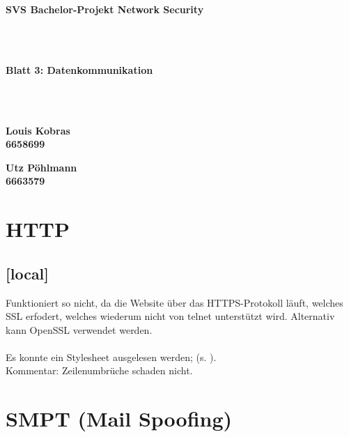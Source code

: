 \documentclass[twoside]{article}
\begin{document}
\pagestyle{fancy}
\fancyhead{}
\fancyfoot{}

\begin{center}
\begin{Huge}
\textbf{SVS Bachelor-Projekt Network Security}
\end{Huge}\\\-\\
\begin{Large}
\textbf{Blatt 3: Datenkommunikation}
\end{Large}\\\-\\
\begin{minipage}[t]{0.48\textwidth}
\begin{center}\textbf{
	Louis Kobras\\
	6658699}
\end{center}
\end{minipage}
\begin{minipage}[t]{0.48\textwidth}
\begin{center}\textbf{
	Utz Pöhlmann\\
	6663579}
\end{center}
\end{minipage}
\end{center}

\section{HTTP}
\subsection{[local]}
Funktioniert so nicht, da die Website über das HTTPS-Protokoll läuft, welches SSL erfodert, welches wiederum nicht von telnet unterstützt wird.
Alternativ kann OpenSSL verwendet werden.\\
\\
Es konnte ein Stylesheet ausgelesen werden; (s. \cite{svscss}).\\
Kommentar: Zeilenumbrüche schaden nicht.


\section{SMPT (Mail Spoofing)}
\end{document}

